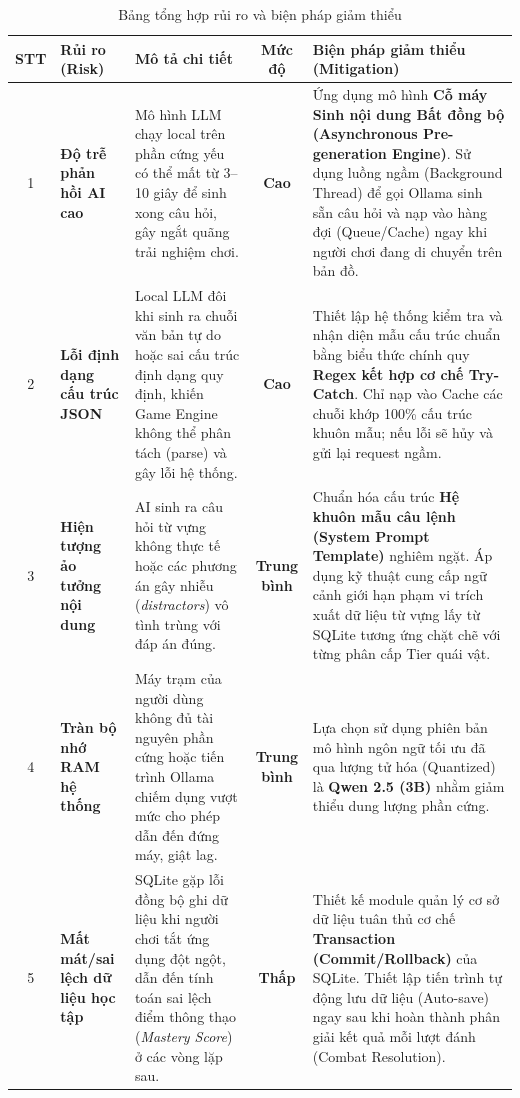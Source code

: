 \begin{table}[H]
\centering
\caption{Bảng tổng hợp rủi ro và biện pháp giảm thiểu}
\label{tab:risk_mitigation}
\small
\noindent\begin{tabularx}{\textwidth}{|c|>{\raggedright\arraybackslash}p{2.5cm}|X|c|X|}
\hline
\textbf{STT} & \textbf{Rủi ro (Risk)} & \textbf{Mô tả chi tiết} & \textbf{Mức độ} & \textbf{Biện pháp giảm thiểu (Mitigation)} \\ \hline
1 & \textbf{Độ trễ phản hồi AI cao} & Mô hình LLM chạy local trên phần cứng yếu có thể mất từ 3--10 giây để sinh xong câu hỏi, gây ngắt quãng trải nghiệm chơi. & \textbf{Cao} & Ứng dụng mô hình \textbf{Cỗ máy Sinh nội dung Bất đồng bộ (Asynchronous Pre-generation Engine)}. Sử dụng luồng ngầm (Background Thread) để gọi Ollama sinh sẵn câu hỏi và nạp vào hàng đợi (Queue/Cache) ngay khi người chơi đang di chuyển trên bản đồ. \\ \hline
2 & \textbf{Lỗi định dạng cấu trúc JSON} & Local LLM đôi khi sinh ra chuỗi văn bản tự do hoặc sai cấu trúc định dạng quy định, khiến Game Engine không thể phân tách (parse) và gây lỗi hệ thống. & \textbf{Cao} & Thiết lập hệ thống kiểm tra và nhận diện mẫu cấu trúc chuẩn bằng biểu thức chính quy \textbf{Regex kết hợp cơ chế Try-Catch}. Chỉ nạp vào Cache các chuỗi khớp 100\% cấu trúc khuôn mẫu; nếu lỗi sẽ hủy và gửi lại request ngầm. \\ \hline
3 & \textbf{Hiện tượng ảo tưởng nội dung} & AI sinh ra câu hỏi từ vựng không thực tế hoặc các phương án gây nhiễu (\textit{distractors}) vô tình trùng với đáp án đúng. & \textbf{Trung bình} & Chuẩn hóa cấu trúc \textbf{Hệ khuôn mẫu câu lệnh (System Prompt Template)} nghiêm ngặt. Áp dụng kỹ thuật cung cấp ngữ cảnh giới hạn phạm vi trích xuất dữ liệu từ vựng lấy từ SQLite tương ứng chặt chẽ với từng phân cấp Tier quái vật. \\ \hline
4 & \textbf{Tràn bộ nhớ RAM hệ thống} & Máy trạm của người dùng không đủ tài nguyên phần cứng hoặc tiến trình Ollama chiếm dụng vượt mức cho phép dẫn đến đứng máy, giật lag. & \textbf{Trung bình} & Lựa chọn sử dụng phiên bản mô hình ngôn ngữ tối ưu đã qua lượng tử hóa (Quantized) là \textbf{Qwen 2.5 (3B)} nhằm giảm thiểu dung lượng phần cứng. \\ \hline
5 & \textbf{Mất mát/sai lệch dữ liệu học tập} & SQLite gặp lỗi đồng bộ ghi dữ liệu khi người chơi tắt ứng dụng đột ngột, dẫn đến tính toán sai lệch điểm thông thạo (\textit{Mastery Score}) ở các vòng lặp sau. & \textbf{Thấp} & Thiết kế module quản lý cơ sở dữ liệu tuân thủ cơ chế \textbf{Transaction (Commit/Rollback)} của SQLite. Thiết lập tiến trình tự động lưu dữ liệu (Auto-save) ngay sau khi hoàn thành phân giải kết quả mỗi lượt đánh (Combat Resolution). \\ \hline
\end{tabularx}
\end{table}

